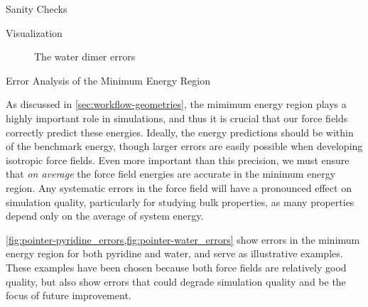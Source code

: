 \begin{subsection}{Sanity Checks}
\begin{paragraph}{Visualization}
\begin{figure}
\centering
{}
\caption[Errors with the water dimer]
{The water dimer errors}
\label{fig:pointer-water_errors}
\end{figure}

\end{paragraph}


\begin{paragraph}{Error Analysis of the Minimum Energy Region}

As discussed in \cref{sec:workflow-geometries}, the mimimum energy region
plays a highly important role in simulations, and thus it is crucial that our
force fields correctly predict these energies. Ideally, the energy predictions
should be within  of the benchmark energy, though larger errors
are easily possible when developing isotropic force fields. Even more
important than this precision, we must ensure that \emph{on average} the force
field energies are accurate in the minimum energy region. Any systematic
errors in the force field will have a pronounced effect on simulation quality,
particularly for studying bulk properties, as many properties depend only on
the average of system energy. 

\cref{fig:pointer-pyridine_errors,fig:pointer-water_errors} show errors in the minimum
energy region for both pyridine and water, and serve as illustrative examples.
These examples have been chosen because both force fields are relatively good quality, but also show errors that could
degrade simulation quality and be the focus of future improvement. 


\end{paragraph}
\end{subsection}
